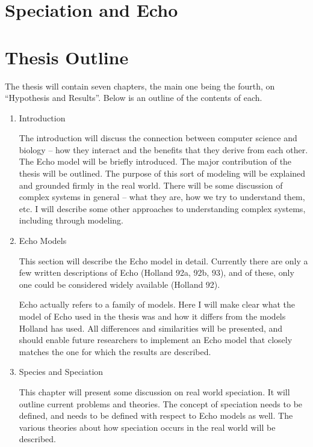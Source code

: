 \section{Speciation and Echo}

\section{Thesis Outline}

The thesis will contain seven chapters, the main one being the fourth,
on ``Hypothesis and Results''. Below is an outline of the contents of
each. 

\begin{enumerate}

\item Introduction

The introduction will discuss the connection between computer science
and biology -- how they interact and the benefits that they derive
from each other. The Echo model will be briefly introduced. The major
contribution of the thesis will be outlined. The purpose of this sort
of modeling will be explained and grounded firmly in the real world.
There will be some discussion of complex systems in general -- what
they are, how we try to understand them, etc. I will describe some
other approaches to understanding complex systems, including through
modeling.

\item Echo Models

This section will describe the Echo model in detail. Currently there
are only a few written descriptions of Echo (Holland 92a, 92b, 93),
and of these, only one could be considered widely available (Holland
92).

Echo actually refers to a family of models. Here I will make clear
what the model of Echo used in the thesis was and how it differs from
the models Holland has used. All differences and similarities will be
presented, and should enable future researchers to implement an Echo
model that closely matches the one for which the results are
described.

\item Species and Speciation

This chapter will present some discussion on real world speciation. It
will outline current problems and theories. The concept of speciation
needs to be defined, and needs to be defined with respect to Echo
models as well. The various theories about how speciation occurs in
the real world will be described.


\end{enumerate}
